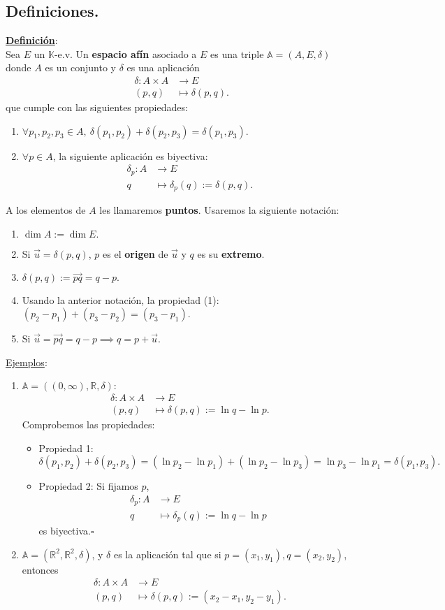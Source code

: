 \documentclass[11pt]{article}
\newcommand{\kev}{$\mathbb{K}$-e.v. }
\newcommand{\af}{\mathbb{A}}
\newcommand{\defi}{\underline{\textbf{Definición}}:\\}
\newcommand{\ej}{\underline{Ejemplos}:\\}
\begin{document}
\subsection{Definiciones.}
\defi Sea $E$ un \kev Un \textbf{espacio afín} asociado a $E$ es una triple $\af=(A,E,\delta)$ donde $A$ es un conjunto y $\delta$ es una aplicación
\begin{align*}
  \delta \colon A\times A &\to E\\
  (p,q) &\mapsto \delta(p,q).
\end{align*}
que cumple con las siguientes propiedades:
\begin{enumerate}
	\item $\forall p_1,p_2,p_3\in A,\ \delta(p_1,p_2)+\delta(p_2,p_3)=\delta(p_1,p_3).$
	\item $\forall p\in A$, la siguiente aplicación es biyectiva:
	\begin{align*}
		\delta_p \colon A &\to E\\
		q &\mapsto \delta_p(q):=\delta(p,q).
	\end{align*}
\end{enumerate}
A los elementos de $A$ les llamaremos \textbf{puntos}. Usaremos la siguiente notación:
\begin{enumerate}
	\item $\dim A:=\dim E.$
	\item Si $\vec{u}=\delta(p,q)$, $p$ es el \textbf{origen} de $\vec{u}$ y $q$ es su \textbf{extremo}.
	\item $\delta(p,q):=\vec{pq}=q-p.$
	\item Usando la anterior notación, la propiedad (1): $(p_2-p_1)+(p_3-p_2)=(p_3-p_1).$
	\item Si $\vec{u}=\vec{pq}=q-p \implies q=p+\vec{u}.$
\end{enumerate}
\ej \begin{enumerate}
	\item $\af=((0,\infty),\mathbb{R},\delta):$
	\begin{align*}
		\delta \colon A\times A &\to E\\
		(p,q) &\mapsto \delta(p,q):=\ln q-\ln p.
	\end{align*}
	Comprobemos las propiedades:
	\begin{itemize}
		\item Propiedad 1: $\delta(p_1,p_2)+\delta(p_2,p_3)=(\ln p_2-\ln p_1)+(\ln p_2-\ln p_3)=\ln p_3-\ln p_1=\delta(p_1,p_3).$
		\item Propiedad 2: Si fijamos $p$,
		\begin{align*}
			\delta_p \colon A &\to E\\
			q &\mapsto \delta_p(q):=\ln q-\ln p
		\end{align*}
		es biyectiva.$\square$
	\end{itemize}
	\item $\af=(\mathbb{R}^2,\mathbb{R}^2,\delta)$, y $\delta$ es la aplicación tal que si $p=(x_1,y_1),q=(x_2,y_2)$, entonces
	\begin{align*}
		\delta \colon A\times A &\to E\\
		(p,q) &\mapsto \delta(p,q):=(x_2-x_1,y_2-y_1).
	\end{align*}
\end{enumerate}
\end{document}
